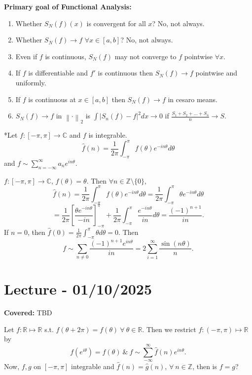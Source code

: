 \documentclass{functionspaces}
\begin{document}
\textbf{Primary goal of Functional Analysis:}
\begin{enumerate}
\item Whether $S_{N}(f)(x)$ is convergent for all $x$? No, not always.
\item Whether $S_{N}(f)\rightarrow f$ $\forall x\in[a,b]$? No, not always.
\item Even if $f$ is continuous, $S_{N}(f)$ may not converge to $f$ pointwise $\forall x$.
\item If $f$ is differentiable and $f'$ is continuous then $S_{N}(f)\rightarrow f$ pointwise and uniformly.
\item If $f$ is continuous at $x\in[a,b]$ then $S_{N}(f)\rightarrow f$ in cesaro means.
\item $S_{N}(f)\rightarrow f$ in $\left\|\cdot\right\|_{2}$ is $\int|S_{n}(f)-f|^{2}dx\rightarrow0$ if $\frac{S_{1}+S_{2}+\ldots+S_{n}}{n}\rightarrow S$.
\end{enumerate}

*Let $f:[-\pi,\pi]\rightarrow\mathbb{C}$ and $f$ is integrable.
\[
\hat{f}(n)=\frac{1}{2\pi}\int_{-\pi}^{\pi}f(\theta)e^{-in\theta}d\theta
\]
and $f\sim\sum_{n=-\infty}^{\infty}a_{n}e^{in\theta}$.

\begin{example}
$f:[-\pi,\pi]\rightarrow\mathbb{C}$, $f(\theta)=\theta$. Then $\forall n\in\mathbb{Z}\setminus\{0\}$,
\[
\hat{f}(n)=\frac{1}{2\pi}\int_{-\pi}^{\pi}f(\theta)e^{-in\theta}d\theta=\frac{1}{2\pi}\int_{-\pi}^{\pi}\theta e^{-in\theta}d\theta
\]
\[
=\frac{1}{2\pi}\left[\frac{\theta e^{-in\theta}}{-in}\right]_{-\pi}^{\pi}+\frac{1}{2\pi}\int_{-\pi}^{\pi}\frac{e^{-in\theta}}{in}d\theta=\frac{(-1)^{n+1}}{in}.
\]
If $n=0$, then $\hat{f}(0)=\frac{1}{2\pi}\int_{-\pi}^{\pi}\theta d\theta=0$. Then
\[
f\sim\sum_{n\neq0}\frac{(-1)^{n+1}e^{in\theta}}{in}=2\sum_{i=1}^{\infty}\frac{\sin(n\theta)}{n}.
\]
\end{example}

\setlength{\parindent}{0pt}
\endgroup

\newpage
\section{Lecture - 01/10/2025}

\textbf{Covered:} TBD

\begingroup
\setlength{\parskip}{6pt}

Let $f:\mathbb{R}\mapsto\mathbb{R}$ s.t. $f(\theta+2\pi)=f(\theta)\ \forall\ \theta\in\mathbb{R}$. Then we restrict $f:(-\pi,\pi)\mapsto\mathbb{R}$ by
\[
f(e^{i\theta})=f(\theta)\ \&\ f\sim\sum_{-\infty}^{\infty}\hat{f}(n)e^{in\theta}.
\]
Now, $f,g$ on $[-\pi,\pi]$ integrable and $\hat{f}(n)=\hat{g}(n)$, $\forall\ n\in\mathbb{Z}$, then is $f=g$?
\end{document}
